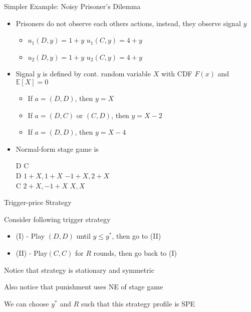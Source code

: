 \documentclass[11pt,aspectratio=169,handout]{beamer}
\begin{document}
  
  \begin{frame}{Simpler Example: Noisy Prisoner's Dilemma}
   \begin{itemize}[<+->]
   \setlength{\itemsep}{0.5em}
    \item Prisoners do not observe each others actions, instead, they observe signal $y$
    \begin{itemize}
     \item $u_{1}(D, y) = 1 + y $   \hspace{1cm} $u_{1}(C, y) = 4 + y $ 
     \item $u_{2}(D, y) = 1 + y $   \hspace{1cm} $u_{2}(C, y) = 4 + y $ 
    \end{itemize}
    \item Signal $y$ is defined by cont. random variable $X$ with CDF $F(x)$ and $\mathbb{E}[X] = 0$
    \begin{itemize}
     \item If $a = (D, D)$, then $y = X$
     \item If $a = (D, C)$ or $(C, D)$, then $y = X - 2$
     \item If $a = (D, D)$, then $y = X - 4$ 
    \end{itemize}
    \item Normal-form stage game is
    \begin{center}\footnotesize
     \hspace{-6em}
     \begin{game}{2}{2}
      	\> D					\> C						\\
      D	\> $1 + X, 1 + X$	\> $ -1 + X, 2 + X$	\\
      C	\> $2 + X, -1 + X$	\> $ X, X$
     \end{game}
    \end{center}
   \end{itemize}
  \end{frame}

  
  \begin{frame} {Trigger-price Strategy}
   \begin{itemizes}[1.2em]
    \item Consider following trigger strategy
    \begin{itemize}
     \item (I) - Play $(D, D)$ until $y \le y^{*}$, then go to (II)
     \item (II) - Play$ (C, C)$ for $R$ rounds, then go back to (I)
    \end{itemize}
    \item Notice that strategy is stationary and symmetric
    \item Also notice that punishment uses \alert{NE of stage game}
    \item We can choose $y^{*}$ and $R$ such that this strategy profile is SPE
   \end{itemizes}
  \end{frame}
\end{document}
